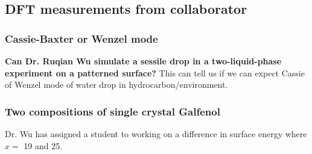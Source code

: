 
\subsection{DFT measurements from collaborator}
\subsubsection{Cassie-Baxter or Wenzel mode}
\textbf{Can Dr. Ruqian Wu simulate a sessile drop in a two-liquid-phase experiment on a patterned surface?} This can tell us if we can expect Cassie of Wenzel mode of water drop in hydrocarbon/\nalk environment. 

\subsubsection{Two compositions of single crystal Galfenol}
Dr. Wu has assigned a student to working on a difference in \fegacomp surface energy where $x =$ 19 and 25.